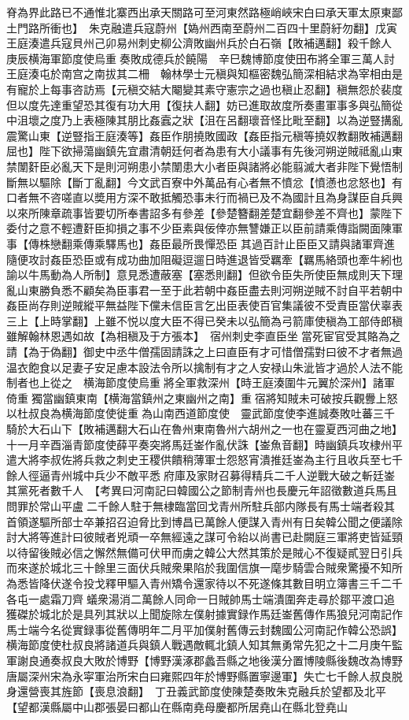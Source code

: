 脊為界此路已不通惟北寨西出承天關路可至河東然路極峭峽宋白曰承天軍太原東鄙土門路所衝也】　朱克融遣兵寇蔚州【媯州西南至蔚州二百四十里蔚紆勿翻】戊寅王庭湊遣兵寇貝州己卯易州刺史柳公濟敗幽州兵於白石嶺【敗補邁翻】殺千餘人　庚辰横海軍節度使烏重奏敗成德兵於饒陽　辛巳魏博節度使田布將全軍三萬人討王庭湊屯於南宫之南拔其二柵　翰林學士元稹與知樞密魏弘簡深相結求為宰相由是有寵於上每事咨訪焉【元稹交結大閹變其素守憲宗之過也稹止忍翻】稹無怨於裴度但以度先達重望恐其復有功大用【復扶人翻】妨已進取故度所奏畫軍事多與弘簡從中沮壞之度乃上表極陳其朋比姦蠧之狀【沮在呂翻瓌音怪比毗至翻】以為逆豎搆亂震驚山東【逆豎指王庭湊等】姦臣作朋撓敗國政【姦臣指元稹等撓奴教翻敗補邁翻屈也】陛下欲掃蕩幽鎮先宜肅清朝廷何者為患有大小議事有先後河朔逆賊祗亂山東禁闈姧臣必亂天下是則河朔患小禁闈患大小者臣與諸將必能翦滅大者非陛下覺悟制斷無以驅除【斷丁亂翻】今文武百寮中外萬品有心者無不憤忿【憤懣也忿怒也】有口者無不咨嗟直以奬用方深不敢抵觸恐事未行而禍已及不為國計且為身謀臣自兵興以來所陳章疏事皆要切所奉書詔多有參差【參楚簪翻差楚宜翻參差不齊也】蒙陛下委付之意不輕遭姧臣抑損之事不少臣素與佞倖亦無讐嫌正以臣前請乘傳詣闕面陳軍事【傳株戀翻乘傳乘驛馬也】姦臣最所畏憚恐臣其過百計止臣臣又請與諸軍齊進隨便攻討姦臣恐臣或有成功曲加阻礙逗遛日時進退皆受羈牽【羈馬絡頭也牽牛紖也諭以牛馬動為人所制】意見悉遭蔽塞【塞悉則翻】但欲令臣失所使臣無成則天下理亂山東勝負悉不顧矣為臣事君一至于此若朝中姦臣盡去則河朔逆賊不討自平若朝中姦臣尚存則逆賊縱平無益陛下儻未信臣言乞出臣表使百官集議彼不受責臣當伏辜表三上【上時掌翻】上雖不悦以度大臣不得已癸未以弘簡為弓箭庫使稹為工部侍郎稹雖解翰林恩遇如故【為相稹及于方張本】　宿州刺史李直臣坐當死宦官受其賂為之請【為于偽翻】御史中丞牛僧孺固請誅之上曰直臣有才可惜僧孺對曰彼不才者無過温衣飽食以足妻子安足慮本設法令所以擒制有才之人安禄山朱泚皆才過於人法不能制者也上從之　横海節度使烏重將全軍救深州【時王庭湊圍牛元翼於深州】諸軍倚重獨當幽鎮東南【横海當鎮州之東幽州之南】重宿將知賊未可破按兵觀釁上怒以杜叔良為横海節度使徙重為山南西道節度使　靈武節度使李進誠奏敗吐蕃三千騎於大石山下【敗補邁翻大石山在魯州東南魯州六胡州之一也在靈夏西河曲之地】　十一月辛酉淄青節度使薛平奏突將馬廷崟作亂伏誅【崟魚音翻】時幽鎮兵攻棣州平遣大將李叔佐將兵救之刺史王稷供饋稍薄軍士怨怒宵潰推廷崟為主行且收兵至七千餘人徑逼青州城中兵少不敵平悉府庫及家財召募得精兵二千人逆戰大破之斬廷崟其黨死者數千人　【考異曰河南記曰韓國公之節制青州也長慶元年詔徵數道兵馬且問罪於常山平盧二千餘人駐于無棣臨當回戈青州所駐兵部内隊長有馬士端者殺其首領遂驅所部士卒兼招召迫脅比到博昌已萬餘人便謀入青州有日矣韓公聞之便議除討大將等進計曰彼賊者兇頑一卒無經遠之謀可令紿以尚書已赴闕庭三軍將吏皆延頸以待留後賊必信之懈然無備可伏甲而虜之韓公大然其策於是賊心不復疑貳翌日引兵而來遂於城北三十餘里三面伏兵賊衆果陷於我圍信旗一麾步騎雲合賊衆驚擾不知所為悉皆降伏遂令投戈釋甲驅入青州矯令還家待以不死遂條其數目明立簿書三千二千各屯一處霜刀齊蟻衆湯消二萬餘人同命一日賊帥馬士端潰圍奔走尋於鄒平渡口追獲磔於城北於是具列其狀以上聞旋除左僕射據實録作馬廷崟舊傳作馬狼兒河南記作馬士端今名從實録事從舊傳明年二月平加僕射舊傳云封魏國公河南記作韓公恐誤】　横海節度使杜叔良將諸道兵與鎮人戰遇敵輒北鎮人知其無勇常先犯之十二月庚午監軍謝良通奏叔良大敗於博野【博野漢涿郡蠡吾縣之地後漢分置博陵縣後魏改為博野唐屬深州宋為永寜軍治所宋白曰雍熙四年於博野縣置寧邊軍】失亡七千餘人叔良脱身還營喪其旌節【喪息浪翻】　丁丑義武節度使陳楚奏敗朱克融兵於望都及北平【望都漢縣屬中山郡張晏曰都山在縣南堯母慶都所居堯山在縣北登堯山